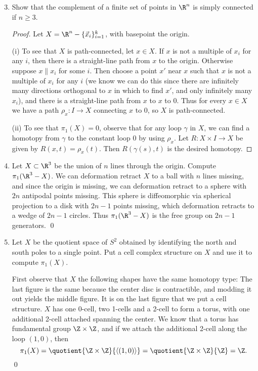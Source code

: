 \documentclass[12pt,letterpaper]{article}
\begin{document}
\begin{enumerate}
\setcounter{enumi}{2}
\item Show that the complement of a finite set of points in $\R^n$ is simply connected if $n\geq3$. 
\begin{proof}
\WLOG{} Let $X=\R^n - \{\vec{x}_i\}_{i=1}^{k}$, with basepoint the origin. 

(i) To see that $X$ is path-connected, let $x\in X$. If $x $ is not a multiple of $ x_i$ for any $i$, then there is a straight-line path from $x$ to the origin. Otherwise suppose $x \parallel x_i$ for some $i$. Then choose a point $x'$ near $x$ such that $x $ is not a multiple of $ x_i$ for any $i$ (we know we can do this since there are infinitely many directions orthogonal to $x$ in which to find $x'$, and only infinitely many $x_i$), and there is a straight-line path from $x$ to $x$ to $0$. Thus for every $x\in X$ we have a path $\rho_x:I\to X$ connecting $x$ to $0$, so $X$ is path-connected.

(ii) To see that $\pi_1(X)=0$, observe that for any loop $\gamma$ in $X$, we can find a homotopy from $\gamma$ to the constant loop $0$ by using $\rho_x$. Let $R:X\times I \to X$ be given by $R(x,t)=\rho_x(t)$. Then $R(\gamma(s),t)$ is the desired homotopy. 
\end{proof}

\item Let $X\subset \R^3$ be the union of $n$ lines through the origin. Compute $\pi_1(\R^3 - X)$. We can deformation retract $X$ to a ball with $n$ lines missing, and since the origin is missing, we can deformation retract to a sphere with $2n$ antipodal points missing. 
This sphere is diffeomorphic via spherical projection to a disk with $2n-1$ points missing, which deformation retracts to a wedge of $2n-1$ circles. Thus $\pi_1(\R^3-X)$ is the free group on $2n-1$ generators. \qed 

\setcounter{enumi}{6}
\item Let $X$ be the quotient space of $S^2$ obtained by identifying the north and south poles to a single point. Put a cell complex structure on $X$ and use it to compute $\pi_1(X)$. 

\answer First observe that $X$ the following shapes have the same homotopy type:
The last figure is the same because the center disc is contractible, and modding it out yields the middle figure. It is on the last figure that we put a cell structure. $X$ has one 0-cell, two 1-cells and a 2-cell to form a torus, with one additional 2-cell attached spanning the center. We know that a torus has fundamental group $\Z\times	\Z$, and if we attach the additional 2-cell along the loop $(1,0)$, then 
$$\pi_1(X)=\quotient{\Z\times\Z}{\langle(1,0)\rangle}=\quotient{\Z\times\Z}{\Z}=\Z.$$
\qed 


\end{enumerate}
\end{document}
